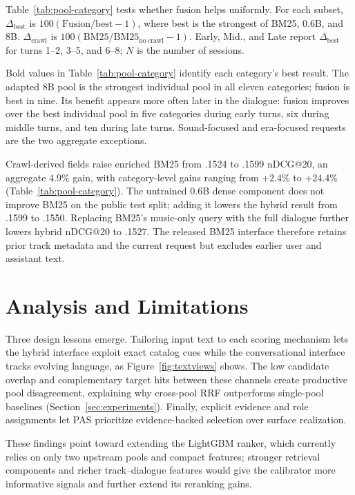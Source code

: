 \documentclass[sigconf]{acmart}
\begin{document}
Table~\ref{tab:pool-category} tests whether fusion helps uniformly. For each
subset, $\Delta_{\mathrm{best}}$ is $100(\mathrm{Fusion}/\mathrm{best}-1)$, where
best is the strongest of BM25, 0.6B, and 8B. $\Delta_{\mathrm{crawl}}$ is
$100(\mathrm{BM25}/\mathrm{BM25}_{\mathrm{no\ crawl}}-1)$. Early, Mid., and
Late report $\Delta_{\mathrm{best}}$ for turns 1--2, 3--5, and 6--8; $N$ is
the number of sessions.


Bold values in Table~\ref{tab:pool-category} identify each category's best
result. The adapted 8B pool is the strongest individual pool in all eleven
categories; fusion is best in nine. Its benefit appears
more often later in the dialogue: fusion improves over the best individual pool
in five categories during early turns, six during middle turns, and ten during
late turns.
Sound-focused and era-focused requests are the two aggregate exceptions.

Crawl-derived fields raise enriched BM25 from .1524 to .1599 nDCG@20, an aggregate
4.9\% gain, with category-level gains ranging from +2.4\% to +24.4\%
(Table~\ref{tab:pool-category}). The untrained 0.6B
dense component does not improve BM25 on the public test split; adding it
lowers the hybrid result from .1599 to .1550. Replacing BM25's music-only query
with the full dialogue further lowers hybrid nDCG@20 to .1527. The released
BM25 interface therefore retains prior track metadata and the current request
but excludes earlier user and assistant text.

\section{Analysis and Limitations}

Three design lessons emerge. Tailoring input text to each scoring mechanism lets the hybrid interface exploit exact catalog cues while the conversational interface tracks evolving language, as Figure~\ref{fig:textviews} shows. The low candidate overlap and complementary target hits between these channels create productive pool disagreement, explaining why cross-pool RRF outperforms single-pool baselines (Section~\ref{sec:experiments}). Finally, explicit evidence and role assignments let PAS prioritize evidence-backed selection over surface realization.

These findings point toward extending the LightGBM ranker, which currently relies on only two upstream pools and compact features; stronger retrieval components and richer track--dialogue features would give the calibrator more informative signals and further extend its reranking gains.
\end{document}
